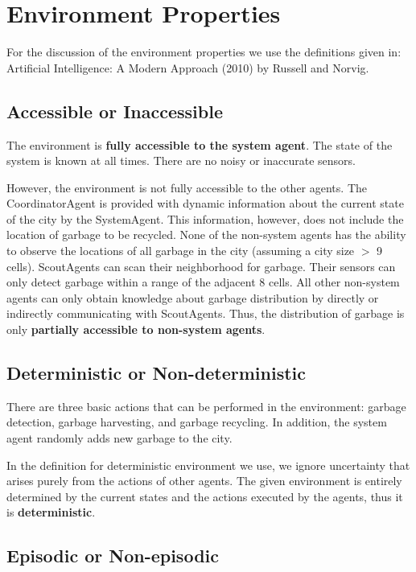 \section{Environment Properties}

For the discussion of the environment properties we use the definitions given in:  Artificial Intelligence: A Modern Approach (2010) by Russell and Norvig.

\subsection{Accessible or Inaccessible}

The environment is \textbf{fully accessible to the system agent}. The state of the system is known at all times. There are no noisy or inaccurate sensors.

However, the environment is not fully accessible to the other agents. The CoordinatorAgent is provided with dynamic information about the current state of the city by the SystemAgent. This information, however, does not include the location of garbage to be recycled. None of the non-system agents has the ability to observe the locations of all garbage in the city (assuming a city size $ > $ 9 cells). ScoutAgents can scan their neighborhood for garbage. Their sensors can only detect garbage within a range of the adjacent 8 cells. All other non-system agents can only obtain knowledge about garbage distribution by directly or indirectly communicating with ScoutAgents. Thus, the distribution of garbage is only \textbf{partially accessible to non-system agents}.


\subsection{Deterministic or Non-deterministic}

There are three basic actions that can be performed in the environment: garbage detection, garbage harvesting, and garbage recycling. In addition, the system agent randomly adds new garbage to the city.

In the definition for deterministic environment we use, we ignore uncertainty that arises purely from the actions of other agents. The given environment is entirely determined by the current states and the actions executed by the agents, thus it is \textbf{deterministic}.


\subsection{Episodic or Non-episodic}

